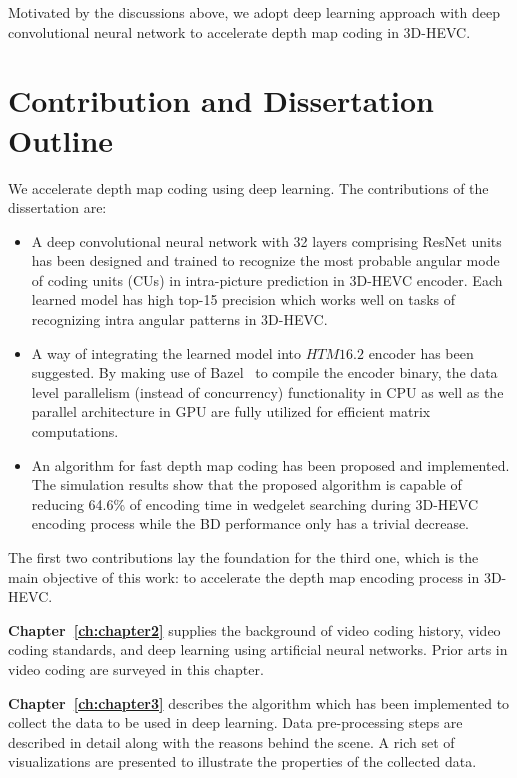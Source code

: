 Motivated by the discussions above, we adopt deep learning approach with
deep convolutional neural network to accelerate depth map coding in
3D-HEVC\@.

\section{Contribution and Dissertation Outline}\label{sec:outline}
We accelerate depth map coding using deep learning.
The contributions of the dissertation are:
\begin{itemize}
  \item A deep convolutional neural network with 32 layers 
  comprising ResNet units~\parencite{RN67}
  has been designed and trained to recognize the
  most probable angular mode of coding units (CUs) 
  in intra-picture prediction in 3D-HEVC
  encoder.
  Each learned model has high top-15 precision which works 
  well on tasks of recognizing intra angular patterns in 3D-HEVC\@.
  \item A way of integrating the learned model into \(HTM16.2\) encoder has
  been suggested.
  By making use of Bazel~\parencite{RN200} to compile the encoder binary, the
  data level parallelism (instead of concurrency) functionality in CPU
  as well as the parallel architecture in GPU are fully utilized for
  efficient matrix computations.
  \item An algorithm for fast
  depth map coding
  has been proposed and implemented.
  The simulation results show that the proposed algorithm is capable of
  reducing 64.6\% of encoding time in wedgelet searching during 3D-HEVC encoding process
  while the BD performance only has a trivial decrease.
\end{itemize}
The first two contributions lay the foundation for the third one, which is the
main objective of this work: to accelerate the depth map encoding process in
3D-HEVC\@.

\textbf{Chapter~\ref{ch:chapter2}} supplies the background of video
coding history, video coding standards, and deep learning using artificial
neural networks.
Prior arts in video coding are surveyed in this chapter.

\textbf{Chapter~\ref{ch:chapter3}} describes the algorithm which has been
implemented to collect the data to be used in deep learning.
Data pre-processing steps are described in detail along with
the reasons behind the scene. 
A rich set of visualizations are presented to illustrate 
the properties of the collected data.


